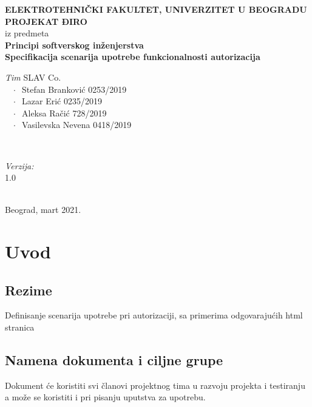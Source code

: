 \documentclass[12pt]{article}
\begin{document}
    \renewcommand{\labelenumii}{\arabic{enumi}.\arabic{enumii}}
	\begin{titlepage}  
		\center
		\textbf{ \LARGE ELEKTROTEHNIČKI FAKULTET, UNIVERZITET U BEOGRADU } \\[4cm]
		\textbf{ \Large PROJEKAT ĐIRO\texttrademark} \\[0.3cm]
		iz predmeta \\[0.3cm]
		\textbf{ \Large Principi softverskog inženjerstva} \\[0.7cm]
		{ \huge \bfseries Specifikacija scenarija upotrebe funkcionalnosti autorizacija } \\[6cm]
		

		\begin{minipage}{0.5\textwidth}
			\begin{flushleft}
				\large
				\emph{Tim} SLAV Co. \\
			     $\;\;\; \cdot \;\;$Stefan Branković  0253/2019\\
			     $\;\;\; \cdot \;\;$Lazar Erić 0235/2019\\
			     $\;\;\; \cdot \;\;$Aleksa Račić 728/2019\\
			     $\;\;\; \cdot \;\;$Vasilevska Nevena 0418/2019
			\end{flushleft}
		\end{minipage}
		~
		\begin{minipage}{0.4\textwidth}
			\begin{flushright}
				\large
				\emph{Verzija:} \\
				1.0
			\end{flushright}
		\end{minipage} \\[2cm]
		\enlargethispage{4\baselineskip}
		{ \large Beograd, mart 2021. }
		\vfill
	\end{titlepage}
\pagebreak
\tableofcontents
\pagebreak



\section{Uvod}
\subsection{Rezime}
Definisanje scenarija upotrebe pri autorizaciji, sa primerima odgovarajućih html stranica
\subsection{Namena dokumenta i ciljne grupe}
Dokument će koristiti svi članovi projektnog tima u razvoju projekta i testiranju a može se koristiti i pri pisanju uputstva za
upotrebu.
\end{document}
